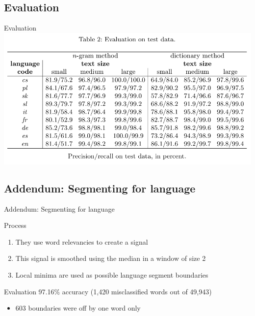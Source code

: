 \documentclass{beamer}
\begin{document}
    \newcommand{\subnine}{Evaluation}
    \subsection{\subnine}
      \begin{frame}{\subnine}
        \includegraphics[scale=0.4]{evaluation.png}
      \end{frame}

    \newcommand{\subten}{Addendum: Segmenting for language}
    \subsection{\subten}
      \begin{frame}{\subten}
        \begin{block}{Process}
          \begin{enumerate}
            \item They use word relevancies to create a signal
            \item This signal is smoothed using the median in a window of size 2
            \item Local minima are used as possible language segment boundaries
          \end{enumerate}
        \end{block}
        \begin{block}{Evaluation}
          97.16\% accuracy (1,420 misclassified words out of 49,943)
          \begin{itemize}
            \item 603 boundaries were off by one word only
          \end{itemize}
        \end{block}
      \end{frame}
\end{document}
